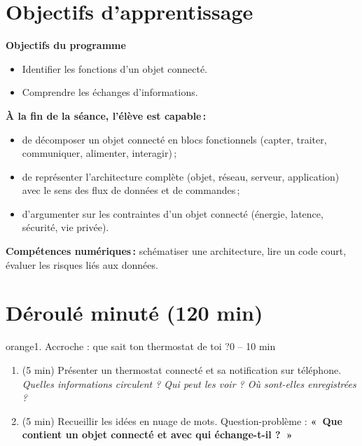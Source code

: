 \documentclass[11pt,a4paper]{article}
\begin{document}
\section{Objectifs d'apprentissage}
\begin{tcolorbox}[colback=gray!8,colframe=gray!60!black,arc=1mm,boxrule=0.5pt]
\textbf{Objectifs du programme}
\begin{itemize}
 \item Identifier les fonctions d'un objet connecté.
 \item Comprendre les échanges d'informations.
\end{itemize}
\textbf{À la fin de la séance, l'élève est capable\,:}
\begin{itemize}
 \item de décomposer un objet connecté en blocs fonctionnels (capter, traiter, communiquer, alimenter, interagir)\,;
 \item de représenter l'architecture complète (objet, réseau, serveur, application) avec le sens des flux de données et de commandes\,;
 \item d'argumenter sur les contraintes d'un objet connecté (énergie, latence, sécurité, vie privée).
\end{itemize}
\textbf{Compétences numériques\,:} schématiser une architecture, lire un code court, évaluer les risques liés aux données.
\end{tcolorbox}

\section{Déroulé minuté (120 min)}

\begin{etape}{orange}{1. Accroche : que sait ton thermostat de toi ?}{0 -- 10 min}
\begin{enumerate}
 \item (5 min) Présenter un thermostat connecté et sa notification sur téléphone. \emph{Quelles informations circulent ? Qui peut les voir ? Où sont-elles enregistrées ?}
 \item (5 min) Recueillir les idées en nuage de mots. Question-problème : \textbf{«~Que contient un objet connecté et avec qui échange-t-il ?~»}
\end{enumerate}
\end{etape}
\end{document}
